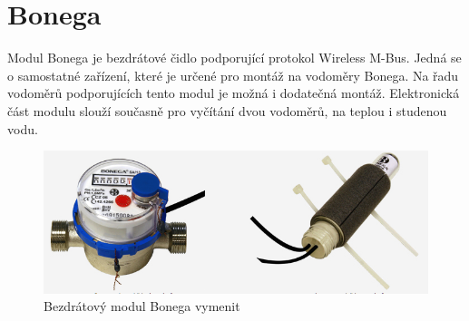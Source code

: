 \begin{table}[!ht]
\begin{tabular}{|c|l|c|}
\end{tabular}
\end{table}


	

	\section{Bonega}

Modul Bonega je bezdrátové čidlo podporující protokol Wireless M-Bus. Jedná se o samostatné zařízení, které je určené pro montáž na vodoměry Bonega. Na řadu vodoměrů podporujících tento modul je možná i dodatečná montáž. Elektronická část modulu slouží současně pro vyčítání dvou vodoměrů, na teplou i studenou vodu.
	
	 \begin{figure}[!h]
  \begin{center}
    \includegraphics[scale=0.70]{obrazky/bonega_fotky}
  \end{center}
  \caption{Bezdrátový modul Bonega \cite{BonegaCidlo} \colorbox[rgb]{0,1,0}{vymenit}}
\end{figure}


